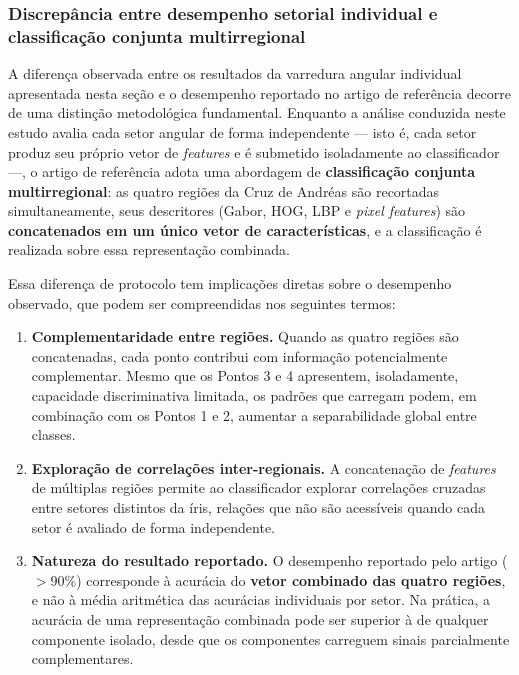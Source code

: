 \documentclass[11pt,a4paper]{article}
\begin{document}
\subsubsection{Discrepância entre desempenho setorial individual e classificação conjunta multirregional}

A diferença observada entre os resultados da varredura angular individual apresentada nesta seção e o desempenho reportado no artigo de referência \citep{SamantAgarwal2018CMPB} decorre de uma distinção metodológica fundamental. Enquanto a análise conduzida neste estudo avalia cada setor angular de forma independente --- isto é, cada setor produz seu próprio vetor de \textit{features} e é submetido isoladamente ao classificador ---, o artigo de referência adota uma abordagem de \textbf{classificação conjunta multirregional}: as quatro regiões da Cruz de Andréas são recortadas simultaneamente, seus descritores (Gabor, HOG, LBP e \textit{pixel features}) são \textbf{concatenados em um único vetor de características}, e a classificação é realizada sobre essa representação combinada.

Essa diferença de protocolo tem implicações diretas sobre o desempenho observado, que podem ser compreendidas nos seguintes termos:

\begin{enumerate}
    \item \textbf{Complementaridade entre regiões.} Quando as quatro regiões são concatenadas, cada ponto contribui com informação potencialmente complementar. Mesmo que os Pontos 3 e 4 apresentem, isoladamente, capacidade discriminativa limitada, os padrões que carregam podem, em combinação com os Pontos 1 e 2, aumentar a separabilidade global entre classes.

    \item \textbf{Exploração de correlações inter-regionais.} A concatenação de \textit{features} de múltiplas regiões permite ao classificador explorar correlações cruzadas entre setores distintos da íris, relações que não são acessíveis quando cada setor é avaliado de forma independente.

    \item \textbf{Natureza do resultado reportado.} O desempenho reportado pelo artigo (\(>\!90\%\)) corresponde à acurácia do \textbf{vetor combinado das quatro regiões}, e não à média aritmética das acurácias individuais por setor. Na prática, a acurácia de uma representação combinada pode ser superior à de qualquer componente isolado, desde que os componentes carreguem sinais parcialmente complementares.
\end{enumerate}
\end{document}

